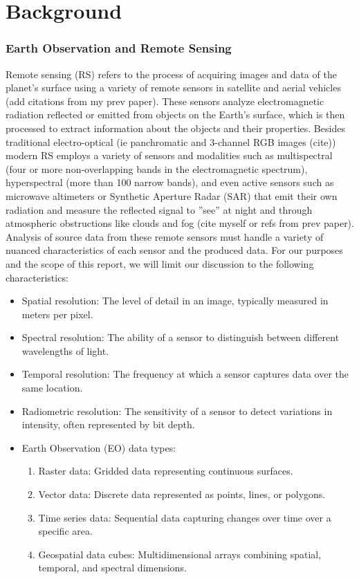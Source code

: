 \section{Background}

\begin{multicols}{2}

\subsubsection{Earth Observation and Remote Sensing}

Remote sensing (RS) refers to the process of acquiring images and data of the planet’s surface using a variety of remote sensors in satellite and aerial vehicles (add citations from my prev paper). 
These sensors analyze electromagnetic radiation reflected or emitted from objects on the Earth’s surface, which is then processed to extract information about the objects and their properties. 
Besides traditional electro-optical (ie panchromatic and 3-channel RGB images (cite)) modern RS employs a variety of sensors and modalities such as multispectral 
(four or more non-overlapping bands in the electromagnetic spectrum), hyperspectral (more than 100 narrow bands), and even active sensors such as microwave altimeters or Synthetic
Aperture Radar (SAR) that emit their own radiation and measure the reflected signal to ”see” at night and through atmospheric obstructions like clouds and fog (cite myself or refs from prev paper). 
Analysis of source data from these remote sensors must handle a variety of nuanced characteristics of each sensor and the produced data. For our purposes and the scope of this report, we will limit our discussion
to the following characteristics: 

\begin{itemize}
    \item Spatial resolution: The level of detail in an image, typically measured in meters per pixel.
    \item Spectral resolution: The ability of a sensor to distinguish between different wavelengths of light.
    \item Temporal resolution: The frequency at which a sensor captures data over the same location.
    \item Radiometric resolution: The sensitivity of a sensor to detect variations in intensity, often represented by bit depth.
    \item Earth Observation (EO) data types:
        \begin{enumerate}
            \item Raster data: Gridded data representing continuous surfaces.
            \item Vector data: Discrete data represented as points, lines, or polygons.
            \item Time series data: Sequential data capturing changes over time over a specific area.
            \item Geospatial data cubes: Multidimensional arrays combining spatial, temporal, and spectral dimensions.
        \end{enumerate}
\end{itemize}


\end{multicols}
